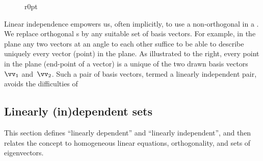 \begin{wrapfigure}r{0pt}
\end{wrapfigure}
Linear independence empowers us, often implicitly, to use a non-orthogonal  in a .
We replace orthogonal s by any suitable set of basis vectors.
For example, in the plane any two vectors at an angle to each other suffice to be able to describe uniquely every vector (point) in the plane.
As illustrated to the right, every point in the plane (end-point of a vector) is a unique  of the two drawn basis vectors~\(\vv_1\) and~\(\vv_2\).
Such a pair of basis vectors, termed a linearly independent pair, avoids the  difficulties of 



\subsection{Linearly (in)dependent sets}

This section defines ``linearly dependent'' and ``linearly independent'', and then relates the concept to homogeneous linear equations, orthogonality, and sets of eigenvectors.


